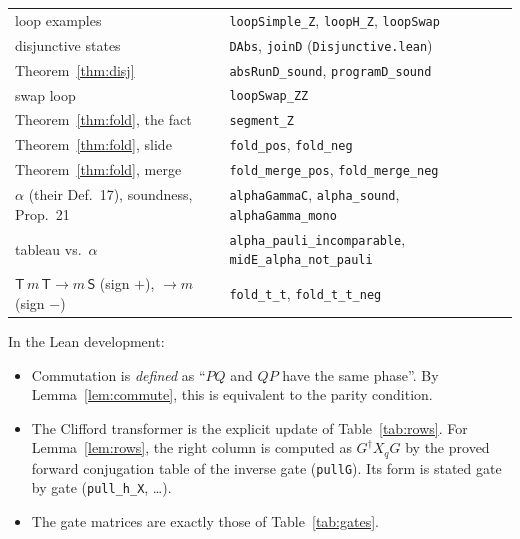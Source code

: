\documentclass[11pt]{article}
\theoremstyle{definition}
\theoremstyle{remark}
\newcommand{\adj}{^{\dagger}}
\newcommand{\gate}[1]{\mathsf{#1}}
\begin{document}
\begin{center}
\begin{tabular}{ll}
loop examples & \texttt{loopSimple\_Z}, \texttt{loopH\_Z}, \texttt{loopSwap} \\
disjunctive states & \texttt{DAbs}, \texttt{joinD} (\texttt{Disjunctive.lean}) \\
Theorem~\ref{thm:disj} & \texttt{absRunD\_sound}, \texttt{programD\_sound} \\
swap loop & \texttt{loopSwap\_ZZ} \\
Theorem~\ref{thm:fold}, the fact & \texttt{segment\_Z} \\
Theorem~\ref{thm:fold}, slide & \texttt{fold\_pos}, \texttt{fold\_neg} \\
Theorem~\ref{thm:fold}, merge & \texttt{fold\_merge\_pos}, \texttt{fold\_merge\_neg} \\
$\alpha$ (their Def.~17), soundness, Prop.~21 & \texttt{alphaGammaC}, \texttt{alpha\_sound}, \texttt{alphaGamma\_mono} \\
tableau vs.\ $\alpha$ & \texttt{alpha\_pauli\_incomparable}, \texttt{midE\_alpha\_not\_pauli} \\
$\gate T\,m\,\gate T \to m\,\gate S$ (sign $+$), $\to m$ (sign $-$) & \texttt{fold\_t\_t}, \texttt{fold\_t\_t\_neg} \\
\bottomrule
\end{tabular}
\end{center}

In the Lean development:

\begin{itemize}[nosep]
  \item Commutation is \emph{defined} as ``$PQ$ and $QP$ have the same phase''. By
  Lemma~\ref{lem:commute}, this is equivalent to the parity condition.
  \item The Clifford transformer is the explicit update of Table~\ref{tab:rows}. For
  Lemma~\ref{lem:rows}, the right column is computed as $G\adj X_q G$ by the proved forward
  conjugation table of the inverse gate (\texttt{pullG}). Its form is stated gate by gate
  (\texttt{pull\_h\_X}, \dots).
  \item The gate matrices are exactly those of Table~\ref{tab:gates}.
\end{itemize}
\end{document}
